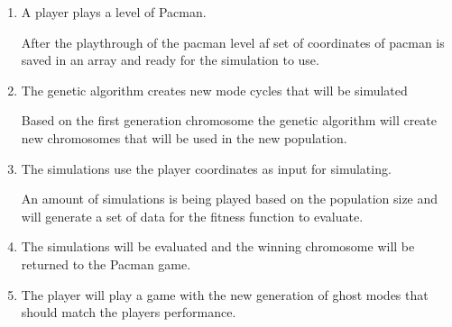 \begin{enumerate}
\item A player plays a level of Pacman.

After the playthrough of the pacman level af set of coordinates of pacman is saved in an array and ready for the simulation to use.

\item The genetic algorithm creates new mode cycles that will be simulated

Based on the first generation chromosome the genetic algorithm will create new chromosomes that will be used in the new population.

\item The simulations use the player coordinates as input for simulating.

An amount of simulations is being played based on the population size and will generate a set of data for the fitness function to evaluate.

\item The simulations will be evaluated and the winning chromosome will be returned to the Pacman game.

\item The player will play a game with the new generation of ghost modes that should match the players performance.

\end{enumerate}

